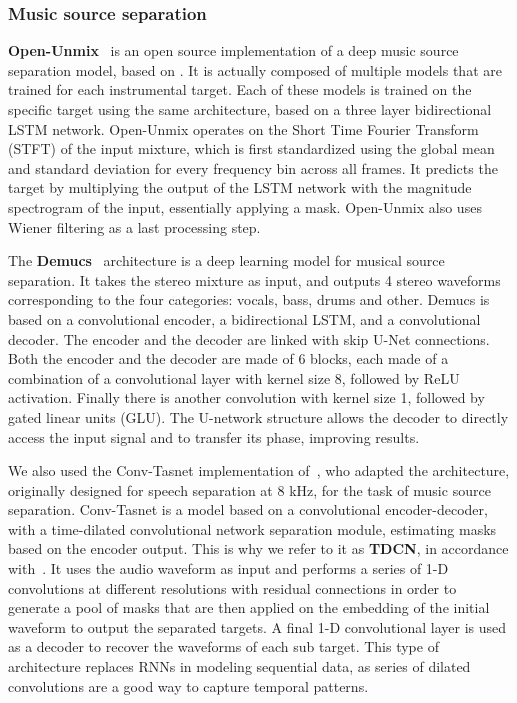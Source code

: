 \documentclass{article}
\begin{document}
      \subsubsection{Music source separation}
      \textbf{Open-Unmix}~\cite{open-unmix} is an open source implementation of a deep music source separation model, based on \cite{Uhlich2017}. It is actually composed of multiple models that are trained for each instrumental target. Each of these models is trained on the specific target using the same architecture, based on a three layer bidirectional LSTM network. Open-Unmix operates on the Short Time Fourier Transform (STFT) of the input mixture, which is first standardized using the global mean and standard deviation for every frequency bin across all frames. It predicts the target by multiplying the output of the LSTM network with the magnitude spectrogram of the input, essentially applying a mask. Open-Unmix also uses Wiener filtering as a last processing step.
      
      The \textbf{Demucs}~\cite{demucs} architecture is a deep learning model for musical source separation. It takes the stereo mixture as input, and outputs 4 stereo waveforms corresponding to the four categories: vocals, bass, drums and other. Demucs is based on a convolutional encoder, a bidirectional LSTM, and a convolutional decoder. The encoder and the decoder are linked with skip U-Net connections. Both the encoder and the decoder are made of 6 blocks, each made of a combination of a convolutional layer with kernel size 8, followed by ReLU activation. Finally there is another convolution with kernel size 1, followed by gated linear units (GLU). The U-network structure allows the decoder to directly access the input signal and to transfer its phase, improving results. 

      We also used the Conv-Tasnet\cite{tdcn} implementation of~\cite{demucs}, who adapted the architecture, originally designed for speech separation at 8 kHz, for the task of music source separation. Conv-Tasnet is a model based on a convolutional encoder-decoder, with a time-dilated convolutional network separation module, estimating masks based on the encoder output. This is why we refer to it as \textbf{TDCN}, in accordance with~\cite{tdcnpp}. It uses the audio waveform as input and performs a series of 1-D convolutions at different resolutions with residual connections in order to generate a pool of masks that are then applied on the embedding of the initial waveform to output the separated targets. A final 1-D convolutional layer is used as a decoder to recover the waveforms of each sub target. This type of architecture replaces RNNs in modeling sequential data, as series of dilated convolutions are a good way to capture temporal patterns.
      
\end{document}
